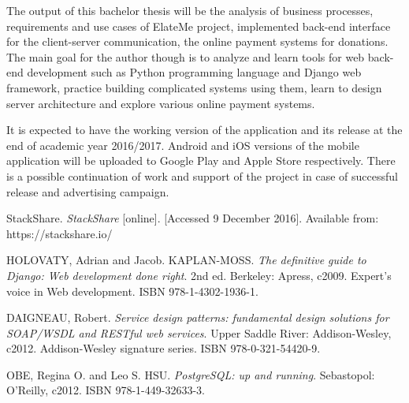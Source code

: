 \documentclass[12pt,a4paper]{report}
\begin{document}
The output of this bachelor thesis will be the analysis of business processes, requirements and use cases of ElateMe project, implemented back-end interface for the client-server communication, the online payment systems for donations. The main goal for the author though is to analyze and learn tools for web back-end development such as Python programming language and Django web framework, practice building complicated systems using them, learn to design server architecture and explore various online payment systems.\par
It is expected to have the working version of the application and its release at the end of academic year 2016/2017. Android and iOS versions of the mobile application will be uploaded to Google Play and Apple Store respectively. There is a possible continuation of work and support of the project in case of successful release and advertising campaign.



\renewcommand\bibname{References}
\begin{thebibliography}{9}
	
StackShare. \emph{StackShare} [online]. [Accessed 9 December 2016]. Available from: https://stackshare.io/

HOLOVATY, Adrian and Jacob. KAPLAN-MOSS. \emph{The definitive guide to Django: Web development done right}. 2nd ed. Berkeley: Apress, c2009. Expert's voice in Web development. ISBN 978-1-4302-1936-1.
	
DAIGNEAU, Robert. \emph{Service design patterns: fundamental design solutions for SOAP/WSDL and RESTful web services}. Upper Saddle River: Addison-Wesley, c2012. Addison-Wesley signature series. ISBN 978-0-321-54420-9.

OBE, Regina O. and Leo S. HSU. \emph{PostgreSQL: up and running}. Sebastopol: O'Reilly, c2012. ISBN 978-1-449-32633-3.

\end{thebibliography}

 
\end{document}
